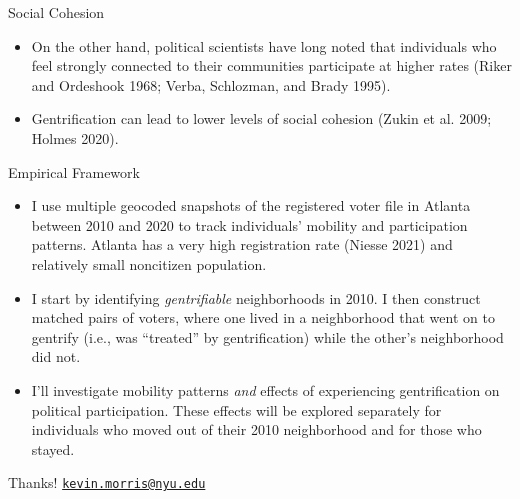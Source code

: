 \documentclass[
  ignorenonframetext,
  aspectratio=169]{beamer}
\providecommand{\tightlist}{%
  \setlength{\itemsep}{0pt}\setlength{\parskip}{0pt}}
\begin{document}
\begin{frame}{Social Cohesion}
\protect\hypertarget{social-cohesion}{}
\begin{itemize}[<+->]
\tightlist
\item
  On the other hand, political scientists have long noted that
  individuals who feel strongly connected to their communities
  participate at higher rates (Riker and Ordeshook 1968; Verba,
  Schlozman, and Brady 1995).
\end{itemize}

\begin{itemize}[<+->]
\tightlist
\item
  Gentrification can lead to lower levels of social cohesion (Zukin et
  al. 2009; Holmes 2020).
\end{itemize}
\end{frame}

\begin{frame}{Empirical Framework}
\protect\hypertarget{empirical-framework}{}
\begin{itemize}[<+->]
\tightlist
\item
  I use multiple geocoded snapshots of the registered voter file in
  Atlanta between 2010 and 2020 to track individuals' mobility and
  participation patterns. Atlanta has a very high registration rate
  (Niesse 2021) and relatively small noncitizen population.
\end{itemize}

\begin{itemize}[<+->]
\tightlist
\item
  I start by identifying \emph{gentrifiable} neighborhoods in 2010. I
  then construct matched pairs of voters, where one lived in a
  neighborhood that went on to gentrify (i.e., was ``treated'' by
  gentrification) while the other's neighborhood did not.
\end{itemize}

\begin{itemize}[<+->]
\tightlist
\item
  I'll investigate mobility patterns \emph{and} effects of experiencing
  gentrification on political participation. These effects will be
  explored separately for individuals who moved out of their 2010
  neighborhood and for those who stayed.
\end{itemize}
\end{frame}

\begin{frame}{Thanks!}
\protect\hypertarget{thanks}{}
\href{mailto:kevin.morris@nyu.edu}{\nolinkurl{kevin.morris@nyu.edu}}
\end{frame}
\end{document}
